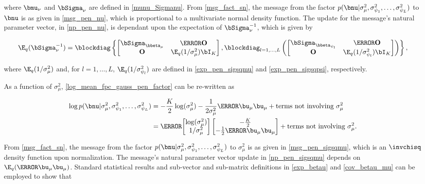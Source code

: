 \documentclass[12pt]{article}
\def\Sigmanu{\bSigma_{\nu}}
\def\munu{\bmu_{\nu}}
\def\sigsqmu{\sigma^2_{\mu}}
\def\betamu{\bbeta_\mu}
\def\umu{\bu_\mu}
\newcommand\betapsi[1]{\bbeta_{\psi_{#1}}}
\newcommand\sigsqpsi[1]{\sigma^2_{\psi_{#1}}}
\newcommand\tni[1]{\text{terms not involving $#1$}}
\theoremstyle{plain}
\theoremstyle{definition}
\theoremstyle{remark}
\begin{document}
\noindent where $\munu$ and $\Sigmanu$ are defined in \eqref{munu_Sigmanu}.
From \eqref{msg_fact_sn}, the message from the factor $p(\bnu | \sigsqmu, \sigsqpsi{1}, \dots, \sigsqpsi{L})$
to $\bnu$ is as given in \eqref{msg_pen_nu}, which is proportional to a multivariate normal density function.
The update for the message's natural parameter vector, in \eqref{np_pen_nu},
is dependant upon the expectation of $\Sigmanu^{-1}$, which is given by

\[
	\E_q (\Sigmanu^{-1}) =
		\blockdiag \left\{
			\begin{bmatrix}
				\bSigma_{\betamu} & \T{\textbf{O}} \\
				\textbf{O} & \E_q (1/\sigsqmu) \bI_K
			\end{bmatrix},
			\blockdiag_{l = 1, \dots, L} \left(
				\begin{bmatrix}
					\bSigma_{\betapsi{l}} & \T{\textbf{O}} \\
					\textbf{O} & \E_q (1/\sigsqpsi{l}) \bI_K
				\end{bmatrix}
			\right)
		\right\},
\]

\noindent where $\E_q (1/\sigsqmu)$ and, for $l = 1, \dots, L$, $\E_q (1/\sigsqpsi{l})$ are defined in
\eqref{exp_pen_sigsqmu} and \eqref{exp_pen_sigsqpsi}, respectively.

As a function of $\sigsqmu$, \eqref{log_mean_fpc_gauss_pen_factor} can be re-written as

\begin{align*}
	\log p(\bnu | \sigsqmu, \sigsqpsi{1}, \dots, \sigsqpsi{L})
		& = -\frac{K}{2} \log (\sigsqmu) - \frac{1}{2\sigsqmu} \T{\umu} \umu + \tni{\sigsqmu} \\
		& = \T{\begin{bmatrix}
			\log (\sigsqmu) \\
			1/\sigsqmu
		\end{bmatrix}} \begin{bmatrix}
			-\frac{K}{2} \\
			-\frac12 \T{\umu} \umu
		\end{bmatrix} + \tni{\sigsqmu}.
\end{align*}

\noindent From \eqref{msg_fact_sn}, the message from the factor $p(\bnu | \sigsqmu, \sigsqpsi{1}, \dots,
\sigsqpsi{L})$ to $\sigsqmu$ is as given in \eqref{msg_pen_sigsqmu}, which is an $\invchisq$
density function upon normalization. The message's natural parameter vector update in \eqref{np_pen_sigsqmu}
depends on $\E_q (\T{\umu} \umu)$. Standard statistical results and sub-vector and sub-matrix definitions in
\eqref{exp_betau} and \eqref{cov_betau_mu} can be employed to show that
\end{document}

